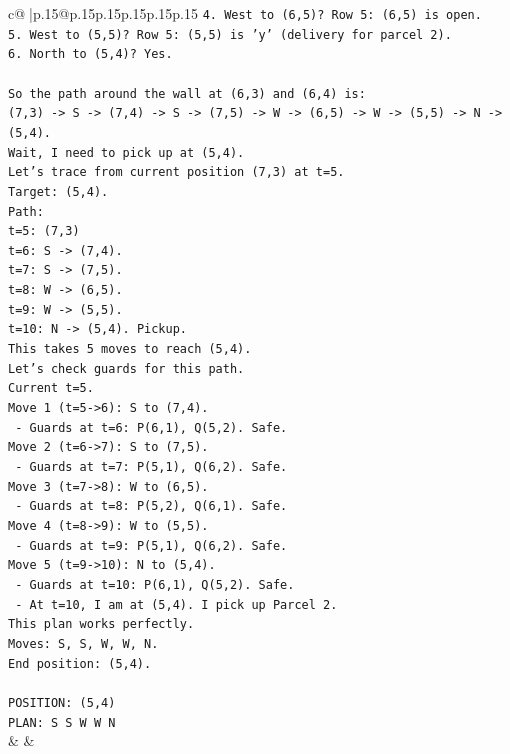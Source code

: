 \documentclass{article}
\begin{document}
{\begin{supertabular}{c@{$\;$}|p{.15\linewidth}@{}p{.15\linewidth}p{.15\linewidth}p{.15\linewidth}p{.15\linewidth}p{.15\linewidth}}
{{{\texttt{4. West to (6,5)? Row 5: (6,5) is open.} \\
\texttt{5. West to (5,5)? Row 5: (5,5) is 'y' (delivery for parcel 2).} \\
\texttt{6. North to (5,4)? Yes.} \\
\\ 
\texttt{So the path around the wall at (6,3) and (6,4) is:} \\
\texttt{(7,3) {-}> S {-}> (7,4) {-}> S {-}> (7,5) {-}> W {-}> (6,5) {-}> W {-}> (5,5) {-}> N {-}> (5,4).} \\
\texttt{Wait, I need to pick up at (5,4).} \\
\texttt{Let's trace from current position (7,3) at t=5.} \\
\texttt{Target: (5,4).} \\
\texttt{Path:} \\
\texttt{t=5: (7,3)} \\
\texttt{t=6: S {-}> (7,4).} \\
\texttt{t=7: S {-}> (7,5).} \\
\texttt{t=8: W {-}> (6,5).} \\
\texttt{t=9: W {-}> (5,5).} \\
\texttt{t=10: N {-}> (5,4). Pickup.} \\
\texttt{This takes 5 moves to reach (5,4).} \\
\texttt{Let's check guards for this path.} \\
\texttt{Current t=5.} \\
\texttt{Move 1 (t=5{-}>6): S to (7,4).} \\
\texttt{  {-} Guards at t=6: P(6,1), Q(5,2). Safe.} \\
\texttt{Move 2 (t=6{-}>7): S to (7,5).} \\
\texttt{  {-} Guards at t=7: P(5,1), Q(6,2). Safe.} \\
\texttt{Move 3 (t=7{-}>8): W to (6,5).} \\
\texttt{  {-} Guards at t=8: P(5,2), Q(6,1). Safe.} \\
\texttt{Move 4 (t=8{-}>9): W to (5,5).} \\
\texttt{  {-} Guards at t=9: P(5,1), Q(6,2). Safe.} \\
\texttt{Move 5 (t=9{-}>10): N to (5,4).} \\
\texttt{  {-} Guards at t=10: P(6,1), Q(5,2). Safe.} \\
\texttt{  {-} At t=10, I am at (5,4). I pick up Parcel 2.} \\
\texttt{This plan works perfectly.} \\
\texttt{Moves: S, S, W, W, N.} \\
\texttt{End position: (5,4).} \\
\\ 
\texttt{POSITION: (5,4)} \\
\texttt{PLAN: S S W W N} \\
            }
        }
    }
    & & \\ \\


\end{supertabular}}
\end{document}

